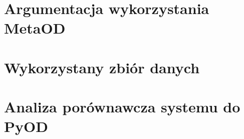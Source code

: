 \chapter{Argumentacja wykorzystania MetaOD}
\label{appendix:appendix1}
\chapter{Wykorzystany zbiór danych}
\chapter{Analiza porównawcza systemu do PyOD}
